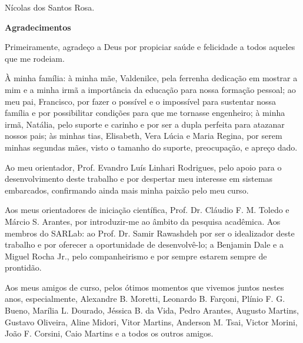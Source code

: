 \begin{flushright}
Nícolas dos Santos Rosa.
\end{flushright}

\cleardoublepage

\vspace{0.11\textheight} 

\begin{center}
\textbf{\Huge{Agradecimentos}}
\end{center}

\vspace{0.05\textheight}

Primeiramente, agradeço a Deus por propiciar saúde e felicidade a todos aqueles que me rodeiam.

À minha família: à minha mãe, Valdenilce, pela ferrenha dedicação em mostrar a mim e a minha irmã a importância da educação para nossa formação pessoal; ao meu pai, Francisco, por fazer o possível e o impossível para sustentar nossa família e por possibilitar condições para que me tornasse engenheiro; à minha irmã, Natália, pelo suporte e carinho e por ser a dupla perfeita para atazanar nossos pais; às minhas tias, Elisabeth, Vera Lúcia e Maria Regina, por serem minhas segundas mães, visto o tamanho do suporte, preocupação, e apreço dado. 

Ao meu orientador, Prof. Evandro Luís Linhari Rodrigues, pelo apoio para o desenvolvimento deste trabalho e por despertar meu interesse em sistemas embarcados, confirmando ainda mais minha paixão pelo meu curso.  

Aos meus orientadores de iniciação científica, Prof. Dr. Cláudio F. M. Toledo e Márcio S. Arantes, por introduzir-me ao âmbito da pesquisa acadêmica. Aos membros do SARLab: ao Prof. Dr. Samir Rawashdeh por ser o idealizador deste trabalho e por oferecer a oportunidade de desenvolvê-lo; a Benjamin Dale e a Miguel Rocha Jr., pelo companheirismo e por sempre estarem sempre de prontidão.

Aos meus amigos de curso, pelos ótimos momentos que vivemos juntos nestes anos, especialmente, Alexandre B. Moretti, Leonardo B. Farçoni, Plínio F. G. Bueno, Marília L. Dourado,  Jéssica B. da Vida, Pedro Arantes, Augusto Martins, Gustavo Oliveira, Aline Midori, Vitor Martins, Anderson M. Tsai, Victor Morini, João F. Corsini, Caio Martins e a todos os outros amigos. 

